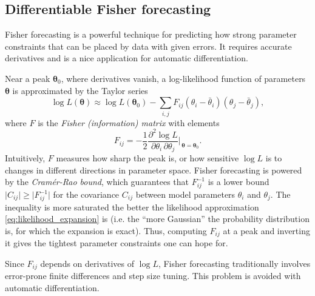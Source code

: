 \documentclass{aa}
\newcommand\TODO[1]{\textcolor{red}{(\textbf{TODO:} #1)}}
\begin{document}
\subsection{Differentiable Fisher forecasting}
\label{sec:fisher}

Fisher forecasting is a powerful technique for predicting how strong parameter constraints that can be placed by data with given errors.
It requires accurate derivatives and is a nice application for automatic differentiation.

Near a peak $\boldsymbol{\theta}_0$, where derivatives vanish, a log-likelihood function of parameters $\boldsymbol{\theta}$ is approximated by the Taylor series
\begin{equation}
    \log L(\boldsymbol{\theta}) \approx \log L(\boldsymbol{\theta}_0) - \sum_{i,j} F_{ij} (\theta_i - \bar{\theta}_i) (\theta_j - \bar{\theta}_j),
\label{eq:likelihood_expansion}
\end{equation}
where $F$ is the \textit{Fisher (information) matrix} with elements
\begin{equation}
    F_{ij} = -\frac12 \frac{\partial^2 \log L}{\partial \theta_i \, \partial \theta_j} \bigg\rvert_{\,\boldsymbol{\theta} = \boldsymbol{\theta}_0} .
\label{eq:fisher_general}
\end{equation}
Intuitively, $F$ measures how sharp the peak is, or how sensitive $\log L$ is to changes in different directions in parameter space.
Fisher forecasting is powered by the \textit{Cramér-Rao bound}, which guarantees that $F^{-1}_{ij}$ is a lower bound $\big\lvert C_{ij}\big\rvert \geq \big\lvert F^{-1}_{ij} \big\rvert$ for the covariance $C_{ij}$ between model parameters $\theta_i$ and $\theta_j$.
The inequality is more saturated the better the likelihood approximation \eqref{eq:likelihood_expansion} is (i.e. the \enquote{more Gaussian} the probability distribution is, for which the expansion is exact).
Thus, computing $F_{ij}$ at a peak and inverting it gives the tightest parameter constraints one can hope for.

Since $F_{ij}$ depends on derivatives of $\log L$, Fisher forecasting traditionally involves error-prone finite differences and step size tuning.
This problem is avoided with automatic differentiation.
\end{document}
